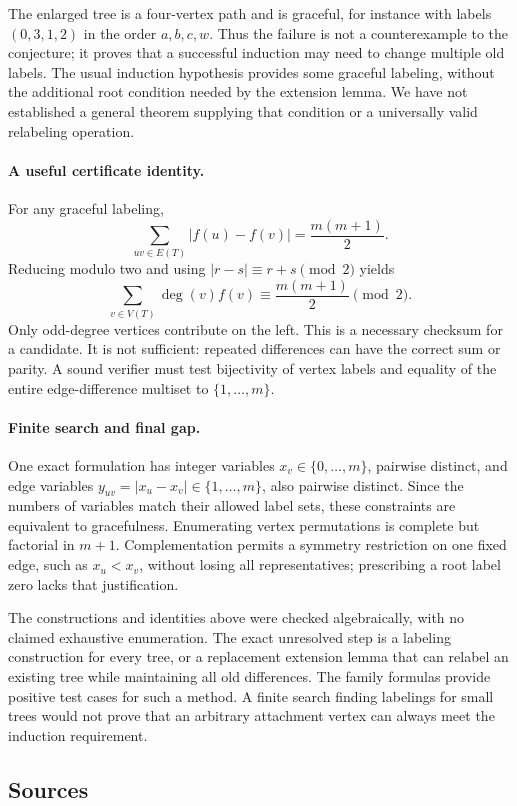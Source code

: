 \documentclass[11pt,a4paper]{article}
\begin{document}
The enlarged tree is a four-vertex path and is graceful, for instance with labels $(0,3,1,2)$ in the order $a,b,c,w$. Thus the failure is not a counterexample to the conjecture; it proves that a successful induction may need to change multiple old labels. The usual induction hypothesis provides some graceful labeling, without the additional root condition needed by the extension lemma. We have not established a general theorem supplying that condition or a universally valid relabeling operation.

\paragraph{A useful certificate identity.}
For any graceful labeling,
\[
\sum_{uv\in E(T)}|f(u)-f(v)|=\frac{m(m+1)}2.
\]
Reducing modulo two and using $|r-s|\equiv r+s\pmod2$ yields
\[
\sum_{v\in V(T)}\deg(v)f(v)\equiv \frac{m(m+1)}2\pmod2.
\]
Only odd-degree vertices contribute on the left. This is a necessary checksum for a candidate. It is not sufficient: repeated differences can have the correct sum or parity. A sound verifier must test bijectivity of vertex labels and equality of the entire edge-difference multiset to $\{1,\ldots,m\}$.

\paragraph{Finite search and final gap.}
One exact formulation has integer variables $x_v\in\{0,\ldots,m\}$, pairwise distinct, and edge variables $y_{uv}=|x_u-x_v|\in\{1,\ldots,m\}$, also pairwise distinct. Since the numbers of variables match their allowed label sets, these constraints are equivalent to gracefulness. Enumerating vertex permutations is complete but factorial in $m+1$. Complementation permits a symmetry restriction on one fixed edge, such as $x_u<x_v$, without losing all representatives; prescribing a root label zero lacks that justification.

The constructions and identities above were checked algebraically, with no claimed exhaustive enumeration. The exact unresolved step is a labeling construction for every tree, or a replacement extension lemma that can relabel an existing tree while maintaining all old differences. The family formulas provide positive test cases for such a method. A finite search finding labelings for small trees would not prove that an arbitrary attachment vertex can always meet the induction requirement.

\subsection{Sources}
\end{document}
